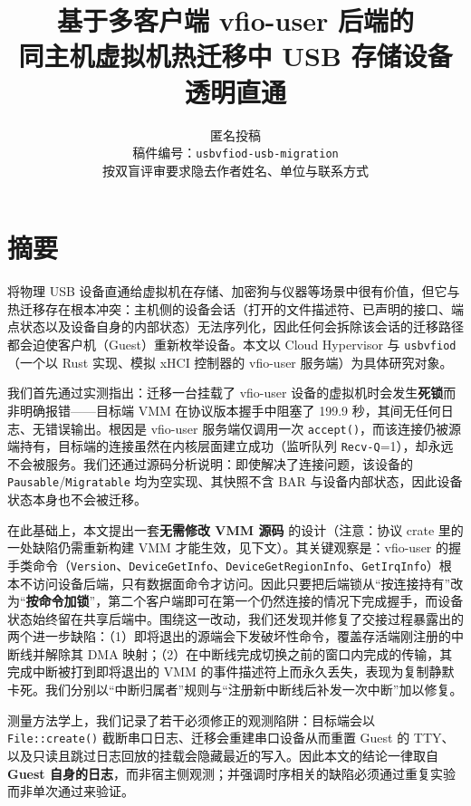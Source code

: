 \documentclass[11pt,a4paper]{ctexart}
\title{\bfseries 基于多客户端 vfio-user 后端的\\同主机虚拟机热迁移中 USB 存储设备透明直通}
\author{匿名投稿\\ \small 稿件编号：\texttt{usbvfiod-usb-migration}\\ \small 按双盲评审要求隐去作者姓名、单位与联系方式}
\date{}
\begin{document}
\maketitle

\section*{摘要}

将物理 USB 设备直通给虚拟机在存储、加密狗与仪器等场景中很有价值，但它与热迁移存在根本冲突：主机侧的设备会话（打开的文件描述符、已声明的接口、端点状态以及设备自身的内部状态）无法序列化，因此任何会拆除该会话的迁移路径都会迫使客户机（Guest）重新枚举设备。本文以 Cloud Hypervisor 与 \texttt{usbvfiod}（一个以 Rust 实现、模拟 xHCI 控制器的 vfio-user 服务端）为具体研究对象。

我们首先通过实测指出：迁移一台挂载了 vfio-user 设备的虚拟机时会发生\textbf{死锁}而非明确报错——目标端 VMM 在协议版本握手中阻塞了 199.9 秒，其间无任何日志、无错误输出。根因是 vfio-user 服务端仅调用一次 \texttt{accept()}，而该连接仍被源端持有，目标端的连接虽然在内核层面建立成功（监听队列 \texttt{Recv-Q}=1），却永远不会被服务。我们还通过源码分析说明：即使解决了连接问题，该设备的 \texttt{Pausable}/\texttt{Migratable} 均为空实现、其快照不含 BAR 与设备内部状态，因此设备状态本身也不会被迁移。

在此基础上，本文提出一套\textbf{无需修改 VMM 源码} 的设计（注意：协议 crate 里的一处缺陷仍需重新构建 VMM 才能生效，见下文）。其关键观察是：vfio-user 的握手类命令（\texttt{Version}、\texttt{DeviceGetInfo}、\texttt{DeviceGetRegionInfo}、\texttt{GetIrqInfo}）根本不访问设备后端，只有数据面命令才访问。因此只要把后端锁从“按连接持有”改为“\textbf{按命令加锁}”，第二个客户端即可在第一个仍然连接的情况下完成握手，而设备状态始终留在共享后端中。围绕这一改动，我们还发现并修复了交接过程暴露出的两个进一步缺陷：（1）即将退出的源端会下发破坏性命令，覆盖存活端刚注册的中断线并解除其 DMA 映射；（2）在中断线完成切换之前的窗口内完成的传输，其完成中断被打到即将退出的 VMM 的事件描述符上而永久丢失，表现为复制静默卡死。我们分别以“中断归属者”规则与“注册新中断线后补发一次中断”加以修复。

测量方法学上，我们记录了若干必须修正的观测陷阱：目标端会以 \texttt{File::create()} 截断串口日志、迁移会重建串口设备从而重置 Guest 的 TTY、以及只读且跳过日志回放的挂载会隐藏最近的写入。因此本文的结论一律取自\textbf{Guest 自身的日志}，而非宿主侧观测；并强调时序相关的缺陷必须通过重复实验而非单次通过来验证。
\end{document}
